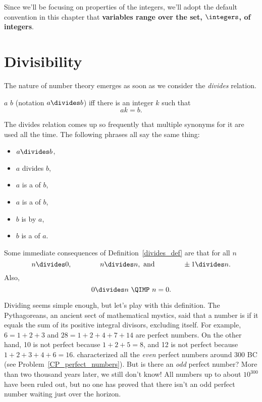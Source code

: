 
Since we'll be focusing on properties of the integers, we'll adopt the
default convention in this chapter that \textbf{variables range over
  the set, $\integers$, of integers}.

\section{Divisibility}\label{divisibility_sec}

The nature of number theory emerges as soon as we consider the \emph{divides} relation.
\begin{definition}\label{divides_def}
$a$  $b$ (notation $a \divides b$) iff there is an integer $k$ such that
\[
ak = b.
\]
\end{definition}
The divides relation comes up so frequently that multiple synonyms for it are used all the
time.  The following phrases all say the same thing:
\begin{itemize}
\item $a \divides b$,
\item $a$ divides $b$,
\item $a$ is a  of $b$,
\item $a$ is a  of $b$,
\item $b$ is  by $a$,
\item $b$ is a  of $a$.
\end{itemize}
Some immediate consequences of Definition~\ref{divides_def} are that for
all $n$
\[
n  \divides 0,\qquad\qquad
n  \divides n, \text{ and}\qquad\qquad
\pm1  \divides n.
\]
Also,
\[
0 \divides n\ \QIMP\ n = 0.
\]

Dividing seems simple enough, but let's play with this definition.  The Pythagoreans, an
ancient sect of mathematical mystics, said that a number is  if it equals the sum of its positive integral divisors, excluding
itself.  For example, $6 = 1 + 2 + 3$ and $28 = 1 + 2 + 4 + 7 + 14$ are perfect numbers.
On the other hand, 10 is not perfect because $1 + 2 + 5 = 8$, and 12 is not perfect because
$1 + 2 + 3 + 4 + 6 = 16$.   characterized all the \emph{even} perfect numbers
around 300 BC (see Problem~\ref{CP_perfect_numbers}).  But is there an \emph{odd} perfect
number?  More than two thousand years later, we still don't know!  All numbers up to about
$10^{300}$ have been ruled out, but no one has proved that there isn't an odd perfect
number waiting just over the horizon.

